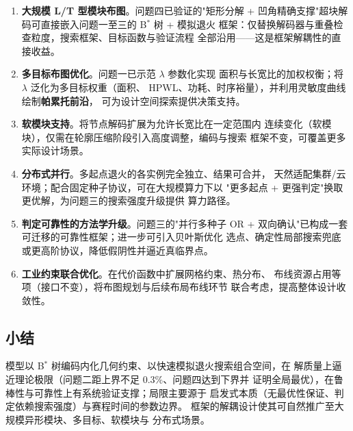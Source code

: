 \documentclass[12pt,a4paper]{article}
\begin{document}
\begin{enumerate}[leftmargin=2em]
    \item \textbf{大规模 L/T 型模块布图}。问题四已验证的"矩形分解 +
    凹角精确支撑"超块解码可直接嵌入问题一至三的 B$^*$ 树 + 模拟退火
    框架：仅替换解码器与重叠检查粒度，搜索框架、目标函数与验证流程
    全部沿用——这是框架解耦性的直接收益。

    \item \textbf{多目标布图优化}。问题一已示范 $\lambda$ 参数化实现
    面积与长宽比的加权权衡；将 $\lambda$ 泛化为多目标权重（面积、
    HPWL、功耗、时序裕量），并利用灵敏度曲线绘制\textbf{帕累托前沿}，
    可为设计空间探索提供决策支持。

    \item \textbf{软模块支持}。将节点解码扩展为允许长宽比在一定范围内
    连续变化（软模块），仅需在轮廓压缩阶段引入高度调整，编码与搜索
    框架不变，可覆盖更多实际设计场景。

    \item \textbf{分布式并行}。多起点退火的各实例完全独立、结果可合并，
    天然适配集群/云环境；配合固定种子协议，可在大规模算力下以
    "更多起点 + 更强判定"换取更优解，为问题三的搜索强度升级提供
    算力路径。

    \item \textbf{判定可靠性的方法学升级}。问题三的"并行多种子 OR +
    双向确认"已构成一套可迁移的可靠性框架；进一步可引入贝叶斯优化
    选点、确定性局部搜索兜底或更高阶协议，降低假阴性并逼近真临界点。

    \item \textbf{工业约束联合优化}。在代价函数中扩展网格约束、热分布、
    布线资源占用等项（接口不变），将布图规划与后续布局布线环节
    联合考虑，提高整体设计收敛性。
\end{enumerate}

\subsection{小结}

模型以 B$^*$ 树编码内化几何约束、以快速模拟退火搜索组合空间，在
解质量上逼近理论极限（问题二距上界不足 0.3\%、问题四达到下界并
证明全局最优），在鲁棒性与可靠性上有系统验证支撑；局限主要源于
启发式本质（无最优性保证、判定依赖搜索强度）与赛程时间的参数边界。
框架的解耦设计使其可自然推广至大规模异形模块、多目标、软模块与
分布式场景。
\end{document}
